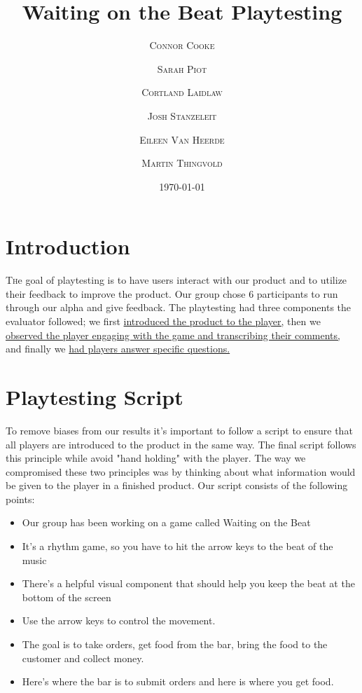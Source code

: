\documentclass[twoside,twocolumn]{article}
\title{Waiting on the Beat Playtesting} %
\author{%
\textsc{Connor Cooke}
\and
\textsc{Sarah Piot}
\and
\textsc{Cortland Laidlaw}
\and
\textsc{Josh Stanzeleit}
\and
\textsc{Eileen Van Heerde}
\and
\textsc{Martin Thingvold}\\
}
\date{\today} %
\begin{document}
\maketitle


\section{Introduction}

\lettrine[nindent=0em,lines=3]{T} he goal of playtesting is to have users interact
with our product and to utilize their feedback to improve the product. Our group chose
6%
participants to run through our alpha and give feedback. The playtesting had three components the evaluator followed; we first \hyperlink{section.2}{introduced the product to the player,} then we \hyperlink{section.3}{observed the player engaging with the
game and transcribing their comments,} and finally we \hyperlink{section.4}{had players answer specific questions.}





\section{Playtesting Script}
\label{sec:script}
To remove biases from our results it's important to follow a script to ensure that all players are introduced
to the product in the same way. The final script follows this principle while avoid "hand holding" with the player.
The way we compromised these two principles was by thinking about what information would be given to the player in a finished product. Our script consists of the following points:

\begin{itemize}
\item Our group has been working on a game called Waiting on the Beat
\item It's a rhythm game, so you have to hit the arrow keys to the beat of the music
\item There's a helpful visual component that should help you keep the beat at the bottom of the screen
\item Use the arrow keys to control the movement.
\item The goal is to take orders, get food from the bar, bring the food to the customer and collect money.
\item Here's where the bar is to submit orders and here is where you get food.
\end{itemize}
\blindtext %
\end{document}
